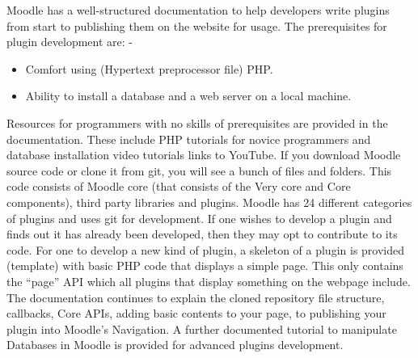 \documentclass[12pt]{article}
\begin{document}
		\noindent Moodle has a well-structured documentation to help developers write plugins from start to publishing them on the 			website for usage. The prerequisites for plugin development are: -
		\begin{itemize}
			\item  Comfort using (Hypertext preprocessor file) PHP.
			\item  Ability to install a database and a web server on a local machine.
		\end{itemize}
		 Resources for programmers with no skills of prerequisites are provided in the documentation. These include PHP 				tutorials for novice programmers and database installation video tutorials links to YouTube.
		 If you download Moodle source code or clone it from git, you will see a bunch of files and folders. This code 				consists of Moodle core (that consists of the Very core and Core components), third party libraries and plugins.  			Moodle has 24 different categories of plugins\cite{moodle} and uses git for development. If one wishes to develop a plugin and 			finds out it has already been developed, then they may opt to contribute to its code. For one to develop a new kind 		of plugin, a skeleton of a plugin is provided (template) with basic PHP code that displays a simple page. This only 				contains the “page” API which all plugins that display something on the webpage include. The documentation 				continues to explain the cloned repository file structure, callbacks, Core APIs, adding basic contents to your page, 			to publishing your plugin into Moodle’s Navigation. A further documented tutorial to manipulate Databases in Moodle 		is provided for advanced plugins development.
\end{document}
